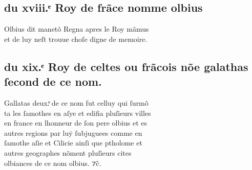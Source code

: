 \documentclass[12pt]{article}
\begin{document}
\subsection*{du xviii.ͤ Roy de frãce nomme olbius}


Olbius dit manetõ Regna apres le Roy mãmus\\
et de luy neſt trouue choſe digne de memoire.





\subsection*{du xix.ͤ Roy de celtes ou frãcois nõe galathas\\
ſecond de ce nom.}


Gallatas deux.ͤ de ce nom fut celluy
          qui ſurmõ\\
ta les ſamothes en aſye et edifia pluſieurs villes\\
en
          france en lhonneur de ſon pere olbius et es\\
autres regions par luẏ ſubjuguees comme en\\
ſamothe aſie et Cilicie ainſi que
            ptholome et\\
autres geographes nõment
          pluſieurs cites\\
olbiances de ce nom olbius.
          ⁊c̃.
\end{document}
